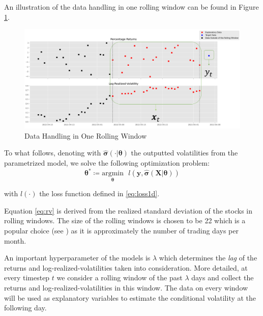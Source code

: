 \documentclass[a4paper, oneside]{discothesis}
\begin{document}
 An illustration of the data handling in one rolling window can be found in Figure \ref{fig:data_handl}.
 
 \begin{figure}[H]
     \centering
     \includegraphics[width = 13cm]{figures/data_variables.png}
     \caption{Data Handling in One Rolling Window}
     \label{fig:data_handl}
 \end{figure}

To what follows, denoting with $\hat{\boldsymbol{\sigma}}(\cdot| \boldsymbol{\theta})$ the outputted volatilities from the parametrized model, we solve the following optimization problem:
\begin{equation}
    \boldsymbol{\theta}^* \coloneqq \underset{\boldsymbol{\theta}}{\mathrm{argmin}}\text{   } l(\mathbf{y}, \hat{\boldsymbol{\sigma}}(\mathbf{X}| \boldsymbol{\theta}))
\end{equation}

with $l(\cdot)$ the loss function defined in \ref{eq:loss1d}.

\begin{mdframed}\begin{remark}\label{rv_discussion}
Equation \ref{eq:rv} is derived from the realized standard deviation of the stocks in rolling windows. The size of the rolling windows is chosen to be 22 which is a popular choice (see \cite{RV_22}) as it is approximately the number of trading days per month. 
\end{remark}\end{mdframed}  

  \begin{mdframed}\begin{remark}\label{ref: lag}
An important hyperparameter of the models is $\lambda$ which determines the \textit{lag} of the returns and log-realized-volatilities taken into consideration. More detailed, at every timestep $t$ we consider a rolling window of the past $\lambda$ days and collect the returns and log-realized-volatilities in this window. The data on every window will be used as explanatory variables to estimate the conditional volatility at the following day. 
\end{remark}\end{mdframed}  
\end{document}
